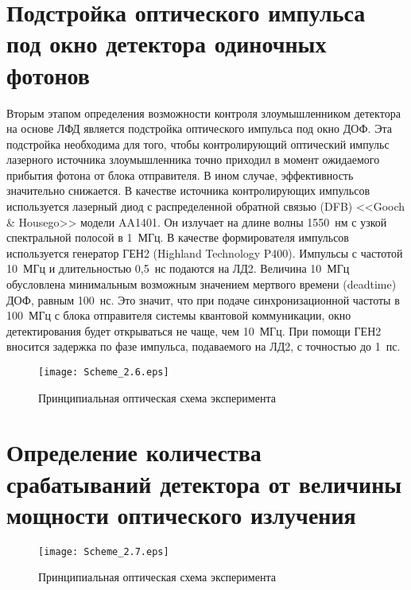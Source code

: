 
\section{Подстройка оптического импульса под окно детектора одиночных фотонов} \label{sec:ch2/sec6}

Вторым этапом определения возможности контроля злоумышленником детектора на основе ЛФД является подстройка оптического импульса под окно ДОФ. Эта подстройка необходима для того, чтобы контролирующий оптический импульс лазерного источника злоумышленника точно приходил в момент ожидаемого прибытия фотона от блока отправителя. В ином случае, эффективность значительно снижается. В качестве источника контролирующих импульсов используется лазерный диод с распределенной обратной связью (DFB) <<Gooch \& Housego>> модели AA1401. Он излучает на длине волны 1550~нм с узкой спектральной полосой в 1~МГц. В качестве формирователя импульсов используется генератор ГЕН2 (Highland Technology P400). Импульсы с частотой 10~МГц и длительностью 0,5~нс подаются на ЛД2. Величина 10~МГц обусловлена минимальным возможным значением мертвого времени (deadtime) ДОФ, равным 100~нс. Это значит, что при подаче синхронизационной частоты в 100~МГц с блока отправителя системы квантовой коммуникации, окно детектирования будет открываться не чаще, чем 10~МГц. При помощи ГЕН2 вносится задержка по фазе импульса, подаваемого на ЛД2, с точностью до 1~пс.   


 \begin{figure}[ht]
  \centering
  \texttt{[image: Scheme\_2.6.eps]}
  \caption{Принципиальная оптическая схема эксперимента}
  \label{fig:Scheme_2.6}
\end{figure}



\section{Определение количества срабатываний детектора от величины мощности оптического излучения} \label{sec:ch2/sec7}


 \begin{figure}[ht]
  \centering
  \texttt{[image: Scheme\_2.7.eps]}
  \caption{Принципиальная оптическая схема эксперимента}
  \label{fig:Scheme_2.7}
\end{figure}



